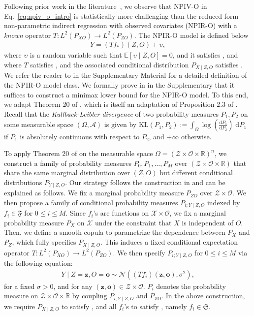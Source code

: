 \documentclass[11pt]{article}
\newcommand{\bz}{\mathbf z}
\newcommand{\bo}{\mathbf o}
\newcommand{\calZ}{\mathcal{Z}}
\newcommand{\calA}{\mathcal{A}}
\newcommand{\calO}{\mathcal{O}}
\newcommand{\calX}{\mathcal{X}}
\newcommand{\0}{\mathbf{0}}
\begin{document}
Following prior work in the literature~\citep{chen2011rate,meunier2024nonparametricinstrumentalregressionkernel}, we observe that NPIV-O in Eq.~\eqref{eq:npiv_o_intro} is statistically more challenging than the reduced form non-parametric indirect regression with observed covariates (NPIR-O) with a \emph{known} operator $T:L^2(P_{XO})\to L^2(P_{ZO})$. The NPIR-O model is defined below
\begin{align}\label{eq:npir}
    Y= (Tf_*)(Z, O) + \upsilon,
\end{align}
where $\upsilon$ is a random variable such that $\mathbb{E}[\upsilon\mid Z,O] = 0$, and it satisfies , and where $T$ satisfies ,  and the associated conditional distribution $P_{X\mid Z,O}$ satisfies . We refer the reader to  in the Supplementary Material for a detailed definition of the NPIR-O model class. We formally prove in  in the Supplementary that it suffices to construct a minimax lower bound for the NPIR-O model. 
To this end, we adapt Theorem 20 of \cite{fischer2020sobolev}, which is itself an adaptation of Proposition 2.3 of \citet{Tsybakov}. Recall that the \emph{Kullback-Leibler divergence} of two probability measures $P_1, P_2$ on some measurable space $(\Omega,\calA)$ is given by $\mathrm{KL}(P_1,P_2) := \int_{\Omega}\log (\frac{\mathrm{d}P_1}{\mathrm{d}P_2} )\;\mathrm{d}P_1$ 
if $P_1$ is absolutely continuous with respect to $P_2$, and $+\infty$ otherwise. 

To apply Theorem 20 of \cite{fischer2020sobolev} on the measurable space $\Omega = (\calZ\times\calO\times\mathbb{R})^{n}$, we construct a family of probability measures $P_0, P_1, \dots, P_M$ over $(\calZ\times\calO\times\mathbb{R})$ that share the same marginal distribution over $(Z,O)$ but different conditional distributions $P_{Y\mid Z, O}$. Our strategy follows the construction in \citet{chen2011rate} and can be explained as follows. We fix a marginal probability measure $P_{ZO}$ over $\calZ\times \calO$. We then propose a family of conditional probability measures $P_{i; Y\mid Z,O}$ indexed by $f_i \in \mathfrak{F}$ for $0\leq i\leq M$. Since $f_i$'s are functions on $\calX\times \calO$, we fix a marginal probability measure $P_X$ on $\calX$ under the constraint that $X$ is independent of $O$. Then, we define a smooth copula to parametrize the dependence between $P_{X}$ and $P_{Z}$, which fully specifies $P_{X\mid Z,O}$. This induces a fixed conditional expectation operator $T : L^2(P_{XO})\to L^2(P_{ZO})$. We then specify $P_{i; Y\mid Z,O}$ for $0\leq i\leq M$ via the following equation:
\begin{align*}
    Y\mid Z = \bz, O = \bo \sim \mathcal{N}((Tf_{i})(\bz, \bo), \sigma^2),
\end{align*}
for a fixed $\sigma>0$, and for any $(\bz,\bo)\in \calZ\times \calO$. $P_i$ denotes the probability measure on $\calZ\times \calO\times \mathbb{R}$ by coupling $P_{i;Y\mid Z,O}$ and $P_{ZO}$. In the above construction, we require $P_{X\mid Z,O}$ to satisfy , and all $f_i$'s to satisfy , namely $f_i\in \mathfrak{S}$. 
\end{document}
